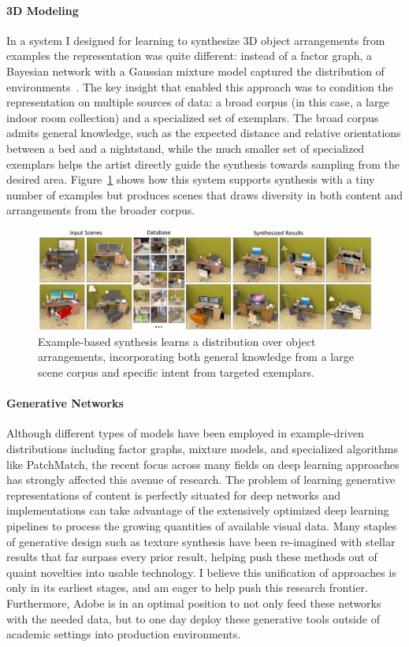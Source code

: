 \documentclass[12pt, a4paper]{article}
\begin{document}
\begin{small}
\paragraph{3D Modeling} In a system I designed for learning to synthesize 3D object arrangements from examples the representation was quite different: instead of a factor graph, a Bayesian network with a Gaussian mixture model captured the distribution of environments~\cite{exampleSynthesis}. The key insight that enabled this approach was to condition the representation on multiple sources of data: a broad corpus (in this case, a large indoor room collection) and a specialized set of exemplars. The broad corpus admits general knowledge, such as the expected distance and relative orientations between a bed and a nightstand, while the much smaller set of specialized exemplars helps the artist directly guide the synthesis towards sampling from the desired area. Figure~\ref{fig:exampleSynth} shows how this system supports synthesis with a tiny number of examples but produces scenes that draws diversity in both content and arrangements from the broader corpus.

\begin{figure}[h]
  \centering
    \includegraphics[width=\textwidth]{figExampleSynthesis.png}
  \caption{Example-based synthesis learns a distribution over object arrangements, incorporating both general knowledge from a large scene corpus and specific intent from targeted exemplars.}
  \label{fig:exampleSynth}  
\end{figure}

\paragraph{Generative Networks} Although different types of models have been employed in example-driven distributions including factor graphs, mixture models, and specialized algorithms like PatchMatch, the recent focus across many fields on deep learning approaches has strongly affected this avenue of research. The problem of learning generative representations of content is perfectly situated for deep networks and implementations can take advantage of the extensively optimized deep learning pipelines to process the growing quantities of available visual data. Many staples of generative design such as texture synthesis have been re-imagined with stellar results that far surpass every prior result, helping push these methods out of quaint novelties into usable technology. I believe this unification of approaches is only in its earliest stages, and am eager to help push this research frontier. Furthermore, Adobe is in an optimal position to not only feed these networks with the needed data, but to one day deploy these generative tools outside of academic settings into production environments.


\end{small}
\end{document}
